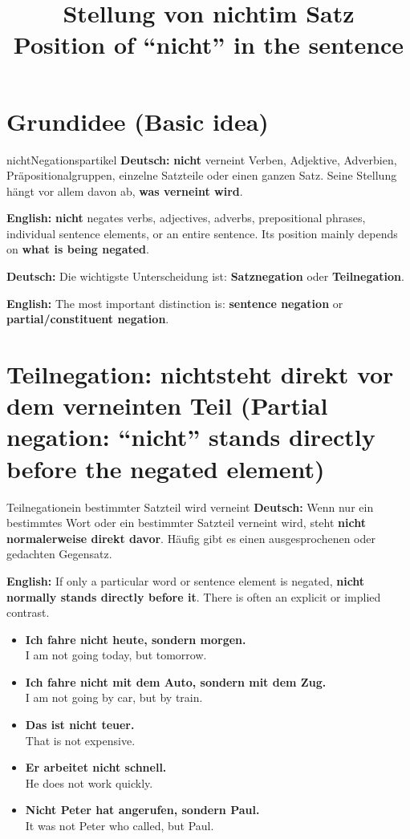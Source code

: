 \documentclass[a4paper,11pt]{article}
\title{Stellung von \glqq nicht\grqq im Satz\\{\large\textnormal{Position of ``nicht'' in the sentence}}}
\date{}
\newcommand{\GermanText}[1]{\textbf{Deutsch: }#1\par}
\newcommand{\EnglishText}[1]{{\small\color{SoftGray}\textbf{English: }#1\par}}
\newcommand{\ExampleItem}[2]{\item \textbf{#1}\\{\small\color{SoftGray}#2}}
\begin{document}
\maketitle
\tableofcontents
\newpage

\section{Grundidee \textnormal{(Basic idea)}}

\begin{grammarentry}{nicht}{Negationspartikel}
\GermanText{\textbf{nicht} verneint Verben, Adjektive, Adverbien, Präpositionalgruppen, einzelne Satzteile oder einen ganzen Satz. Seine Stellung hängt vor allem davon ab, \textbf{was verneint wird}.}
\EnglishText{\textbf{nicht} negates verbs, adjectives, adverbs, prepositional phrases, individual sentence elements, or an entire sentence. Its position mainly depends on \textbf{what is being negated}.}

\GermanText{Die wichtigste Unterscheidung ist: \textbf{Satznegation} oder \textbf{Teilnegation}.}
\EnglishText{The most important distinction is: \textbf{sentence negation} or \textbf{partial/constituent negation}.}
\end{grammarentry}

\section{Teilnegation: \glqq nicht\grqq steht direkt vor dem verneinten Teil \textnormal{(Partial negation: ``nicht'' stands directly before the negated element)}}

\begin{grammarentry}{Teilnegation}{ein bestimmter Satzteil wird verneint}
\GermanText{Wenn nur ein bestimmtes Wort oder ein bestimmter Satzteil verneint wird, steht \textbf{nicht normalerweise direkt davor}. Häufig gibt es einen ausgesprochenen oder gedachten Gegensatz.}
\EnglishText{If only a particular word or sentence element is negated, \textbf{nicht normally stands directly before it}. There is often an explicit or implied contrast.}
\end{grammarentry}

\begin{exbox}
\begin{itemize}
\ExampleItem{Ich fahre \textbf{nicht heute}, sondern morgen.}{I am not going today, but tomorrow.}
\ExampleItem{Ich fahre \textbf{nicht mit dem Auto}, sondern mit dem Zug.}{I am not going by car, but by train.}
\ExampleItem{Das ist \textbf{nicht teuer}.}{That is not expensive.}
\ExampleItem{Er arbeitet \textbf{nicht schnell}.}{He does not work quickly.}
\ExampleItem{\textbf{Nicht Peter} hat angerufen, sondern Paul.}{It was not Peter who called, but Paul.}
\end{itemize}
\end{exbox}
\end{document}
